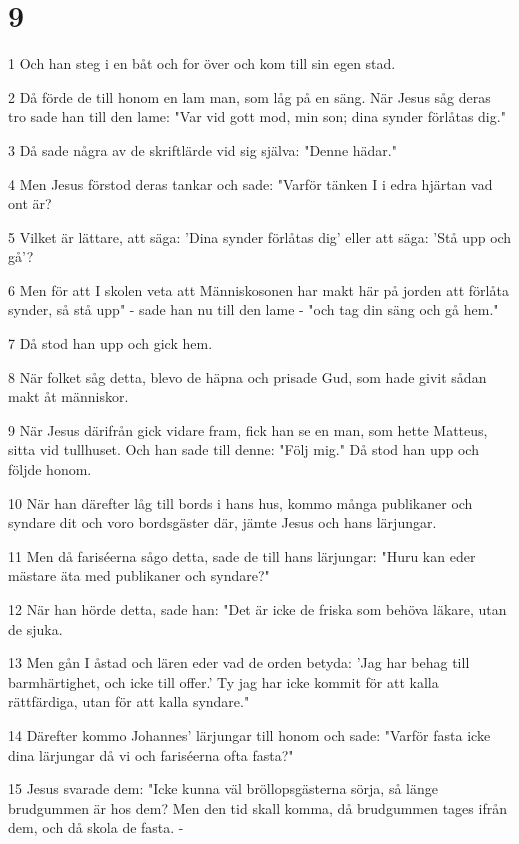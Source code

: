 \chapter{9}

\par 1 Och han steg i en båt och for över och kom till sin egen stad.
\par 2 Då förde de till honom en lam man, som låg på en säng. När Jesus såg deras tro sade han till den lame: "Var vid gott mod, min son; dina synder förlåtas dig."
\par 3 Då sade några av de skriftlärde vid sig själva: "Denne hädar."
\par 4 Men Jesus förstod deras tankar och sade: "Varför tänken I i edra hjärtan vad ont är?
\par 5 Vilket är lättare, att säga: 'Dina synder förlåtas dig' eller att säga: 'Stå upp och gå'?
\par 6 Men för att I skolen veta att Människosonen har makt här på jorden att förlåta synder, så stå upp" - sade han nu till den lame - "och tag din säng och gå hem."
\par 7 Då stod han upp och gick hem.
\par 8 När folket såg detta, blevo de häpna och prisade Gud, som hade givit sådan makt åt människor.
\par 9 När Jesus därifrån gick vidare fram, fick han se en man, som hette Matteus, sitta vid tullhuset. Och han sade till denne: "Följ mig." Då stod han upp och följde honom.
\par 10 När han därefter låg till bords i hans hus, kommo många publikaner och syndare dit och voro bordsgäster där, jämte Jesus och hans lärjungar.
\par 11 Men då fariséerna sågo detta, sade de till hans lärjungar: "Huru kan eder mästare äta med publikaner och syndare?"
\par 12 När han hörde detta, sade han: "Det är icke de friska som behöva läkare, utan de sjuka.
\par 13 Men gån I åstad och lären eder vad de orden betyda: 'Jag har behag till barmhärtighet, och icke till offer.' Ty jag har icke kommit för att kalla rättfärdiga, utan för att kalla syndare."
\par 14 Därefter kommo Johannes' lärjungar till honom och sade: "Varför fasta icke dina lärjungar då vi och fariséerna ofta fasta?"
\par 15 Jesus svarade dem: "Icke kunna väl bröllopsgästerna sörja, så länge brudgummen är hos dem? Men den tid skall komma, då brudgummen tages ifrån dem, och då skola de fasta. -
